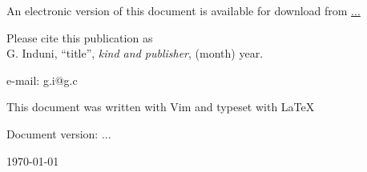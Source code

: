 An electronic version of this document is available for download from \url{...}

Please cite this publication as\\
G. Induni, ``title'', \emph{kind and publisher}, (month) year.

e-mail: g.i@g.c

This document was written with Vim and typeset with \LaTeX

Document version: ...

\today
